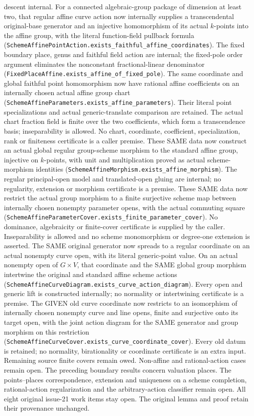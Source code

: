\documentclass[11pt,oneside]{article}
\theoremstyle{definition}
\theoremstyle{remark}
\newcommand{\lean}[1]{\nolinkurl{#1}}
\begin{document}
descent internal. For a connected algebraic-group package of dimension at least two, that
regular affine curve action now internally supplies a transcendental original-base generator
and an injective homomorphism of its actual $k$-points into the affine group, with the literal
function-field pullback formula
(\lean{SchemeAffinePointAction.exists_faithful_affine_coordinates}). The fixed boundary
place, genus and faithful field action are internal; the fixed-pole order argument eliminates
the nonconstant fractional-linear denominator
(\lean{FixedPlaceAffine.exists_affine_of_fixed_pole}). The same coordinate and global
faithful point homomorphism now have rational affine coefficients on an internally chosen
actual affine group chart
(\lean{SchemeAffineParameters.exists_affine_parameters}). Their literal point
specializations and actual generic-translate comparison are retained. The actual chart
fraction field is finite over the two coefficients, which form a transcendence basis;
inseparability is allowed. No chart, coordinate, coefficient, specialization, rank or
finiteness certificate is a caller premise. These SAME data now construct an actual global
regular group-scheme morphism to the standard affine group, injective on $k$-points, with
unit and multiplication proved as actual scheme-morphism identities
(\lean{SchemeAffineMorphism.exists_affine_morphism}). The regular principal-open model and
translated-open gluing are internal; no regularity, extension or morphism certificate is
a premise. These SAME data now restrict the actual group morphism to a finite surjective scheme
map between internally chosen nonempty parameter opens, with the actual commuting square
(\lean{SchemeAffineParameterCover.exists_finite_parameter_cover}). No dominance, algebraicity
or finite-cover certificate is supplied by the caller. Inseparability is allowed and no scheme
monomorphism or degree-one extension is asserted. The SAME original generator now spreads to
a regular coordinate on an actual nonempty curve open, with its literal generic-point value.
On an actual nonempty open of $G\times V$, that coordinate and the SAME global group morphism
intertwine the original and standard affine scheme actions
(\lean{SchemeAffineCurveDiagram.exists_curve_action_diagram}). Every open and generic lift
is constructed internally; no normality or intertwining certificate is a premise. The GIVEN
old curve coordinate now restricts to an isomorphism of internally chosen nonempty curve and
line opens, finite and surjective onto its target open, with the joint action diagram for the
SAME generator and group morphism on this restriction
(\lean{SchemeAffineCurveCover.exists_curve_coordinate_cover}). Every old datum is retained;
no normality, birationality or coordinate certificate is an extra input. Remaining source
finite covers remain owed.
Non-affine and rational-action cases remain open.
The preceding boundary results concern valuation places. The points--places
correspondence, extension and uniqueness on a scheme completion, rational-action
regularization and the arbitrary-action classifier remain open. All eight original issue-21 work items stay open. The original lemma and
proof retain their provenance unchanged.
\end{document}
